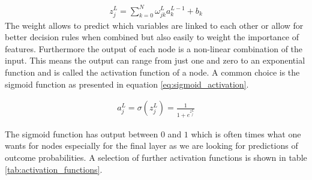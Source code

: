 \begin{align}
    z_j^L = \sum_{k=0}^{N} \omega_{jk}^L a_k^{L-1} + b_k
    \label{eq:node_input}
\end{align}
The weight allows to predict which variables are linked to each other or allow for better decision rules when combined but also easily to weight the importance of features. Furthermore the output of each node is a non-linear combination of the input. This means the output can range from just one and zero to an exponential function and is called the activation function of a node. A common choice is the sigmoid function as presented in equation \eqref{eq:sigmoid_activation}.~\cite{chollet2015keras}

\begin{align}
    a_j^L = \sigma ( z_j^L ) = \frac{1}{1 + e^{z_j^L}}
    \label{eq:sigmoid_activation}
\end{align}

The sigmoid function has output between $0$ and $1$ which is often times what one wants for nodes especially for the final layer as we are looking for predictions of outcome probabilities. A selection of further activation functions is shown in table \ref{tab:activation_functions}.

